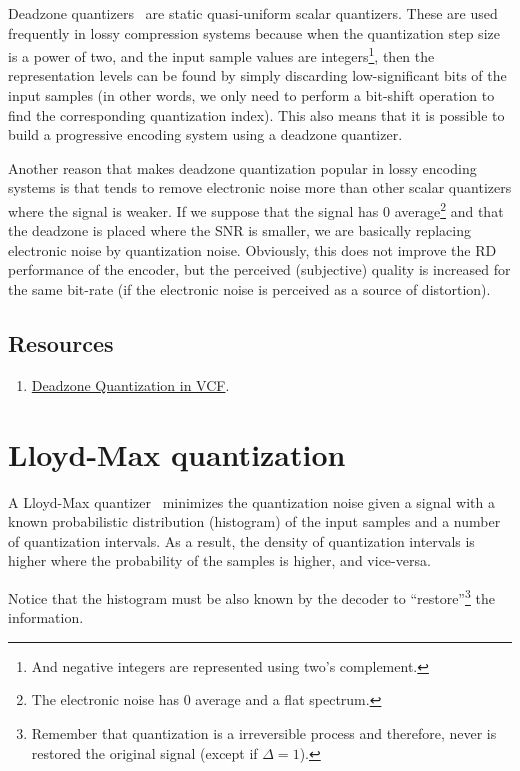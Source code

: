 Deadzone quantizers~\cite{vruiz__scalar_quantization} are static
quasi-uniform scalar quantizers. These are used frequently in lossy
compression systems because when the quantization step size is a power
of two, and the input sample values are integers\footnote{And negative
integers are represented using two's complement.}, then the
representation levels can be found by simply discarding
low-significant bits of the input samples (in other words, we only
need to perform a bit-shift operation to find the corresponding
quantization index). This also means that it is possible to build a
progressive encoding system using a deadzone quantizer.

Another reason that makes deadzone quantization popular in lossy
encoding systems is that tends to remove electronic noise more than
other scalar quantizers where the signal is weaker. If we suppose that
the signal has 0 average\footnote{The electronic noise has 0 average
and a flat spectrum.} and that the deadzone is placed where the SNR is
smaller, we are basically replacing electronic noise by quantization
noise. Obviously, this does not improve the RD performance of the
encoder, but the perceived (subjective) quality is increased for the
same bit-rate (if the electronic noise is perceived as a source of
distortion).

\subsection*{Resources}
\begin{enumerate}
\item
  \href{https://github.com/Sistemas-Multimedia/VCF/blob/main/src/deadzone.py}{Deadzone
    Quantization in VCF}.
\end{enumerate}

\section{Lloyd-Max quantization}

A Lloyd-Max quantizer~\cite{vruiz__scalar_quantization} minimizes the
quantization noise given a signal with a known probabilistic
distribution (histogram) of the input samples and a number of
quantization intervals. As a result, the density of quantization
intervals is higher where the probability of the samples is higher, and
vice-versa.

Notice that the histogram must be also known by the decoder to
``restore''\footnote{Remember that quantization is a irreversible
process and therefore, never is restored the original signal (except
if $\Delta=1$).} the information.

